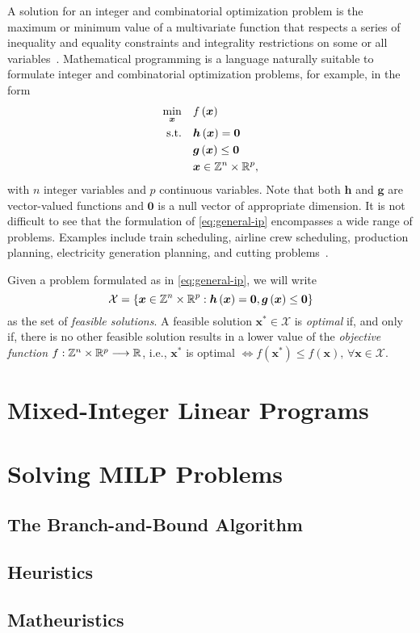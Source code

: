 A solution for an integer and combinatorial optimization problem is the maximum or minimum value of a multivariate function that respects a series of inequality and equality constraints and integrality restrictions on some or all variables~\cite{nemhauserIntegerCombinatorialOptimization1999}.
Mathematical programming is a language naturally suitable to formulate integer and combinatorial optimization problems, for example, in the form
\begin{equation}\label{eq:general-ip}
    \begin{split}
	\min_{\bm{x}} \quad & f\left( \bm{x} \right) \\
	\textrm{s.t.} \quad & \bm{h}\left( \bm{x} \right) = \bm{0} \\
	  & \bm{g}\left( \bm{x} \right) \le \bm{0} \\
	  & \bm{x} \in \mathbb{Z}^{n}\times \mathbb{R}^{p}
    ,\end{split}
\end{equation}
with $n$ integer variables and $p$ continuous variables.
Note that both $\bm{h}$ and $\bm{g}$ are vector-valued functions and $\bm{0}$ is a null vector of appropriate dimension.
It is not difficult to see that the formulation of \eqref{eq:general-ip} encompasses a wide range of problems.
Examples include train scheduling, airline crew scheduling, production planning, electricity generation planning, and cutting problems~\cite{wolseyIntegerProgramming1998}.

Given a problem formulated as in \eqref{eq:general-ip}, we will write \[
\mathcal{X}=\left\{ \bm{x}\in \mathbb{Z}^{n}\times \mathbb{R}^{p}: \bm{h}\left( \bm{x} \right) = \bm{0}, \bm{g}\left( \bm{x} \right) \le \bm{0}\right\} 
\] as the set of \emph{feasible solutions}.
A feasible solution $\bm{x}^{*}\in \mathcal{X}$ is \emph{optimal} if, and only if, there is no other feasible solution results in a lower value of the \emph{objective function} $f: \mathbb{Z}^{n}\times \mathbb{R}^{p} \longrightarrow \mathbb{R}$, i.e., $\bm{x}^{*}$ is optimal $\iff f(\bm{x}^{*}) \le f(\bm{x}) ,\,\forall \bm{x}\in \mathcal{X}$.



\section{Mixed-Integer Linear Programs}

\section{Solving MILP Problems}

\subsection{The Branch-and-Bound Algorithm}

\subsection{Heuristics}

\subsection{Matheuristics}

